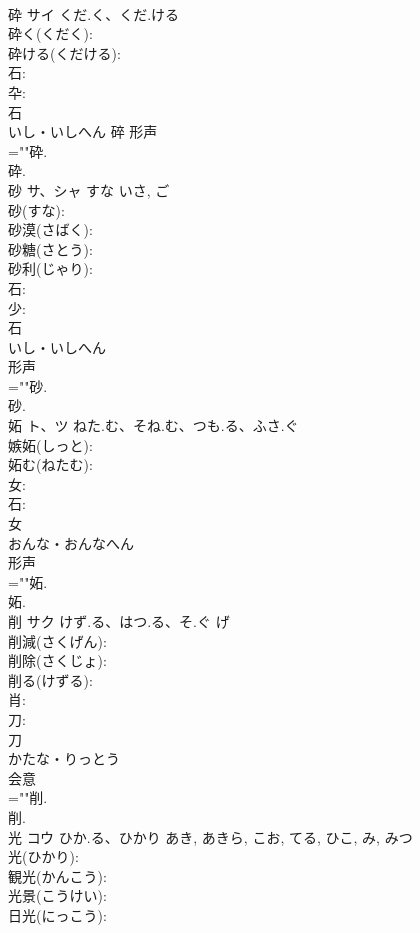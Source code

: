 \documentclass[8pt]{extreport}
\begin{document}
\begin{CJK}{UTF8}{min}
\\	砕	サイ	くだ.く、くだ.ける		
\\	砕く(くだく): 
\\	砕ける(くだける): 
\\	石: 
\\	卆: 
\\	石	
\\	いし・いしへん	碎	形声 
\\	=""砕.
\\	砕.
\\	砂	サ、シャ	すな	いさ, ご	
\\	砂(すな): 
\\	砂漠(さばく): 
\\	砂糖(さとう): 
\\	砂利(じゃり): 
\\	石: 
\\	少: 
\\	石	
\\	いし・いしへん	
\\	形声 
\\	=""砂.
\\	砂.
\\	妬	ト、ツ	ねた.む、そね.む、つも.る、ふさ.ぐ		
\\	嫉妬(しっと): 
\\	妬む(ねたむ): 
\\	女: 
\\	石: 
\\	女	
\\	おんな・おんなへん	
\\	形声 
\\	=""妬.
\\	妬.
\\	削	サク	けず.る、はつ.る、そ.ぐ	げ	
\\	削減(さくげん): 
\\	削除(さくじょ): 
\\	削る(けずる): 
\\	肖: 
\\	刀: 
\\	刀	
\\	かたな・りっとう	
\\	会意 
\\	=""削.
\\	削.
\\	光	コウ	ひか.る、ひかり	あき, あきら, こお, てる, ひこ, み, みつ	
\\	光(ひかり): 
\\	観光(かんこう): 
\\	光景(こうけい): 
\\	日光(にっこう): 

\end{CJK}
\end{document}
